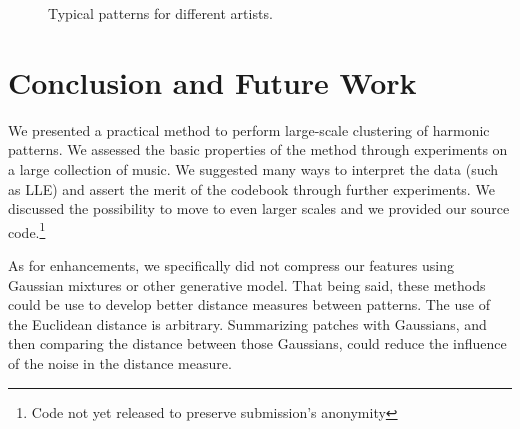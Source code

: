 \documentclass{article}
\begin{document}
\begin{figure}[htb]
  \centering
  \hspace{5mm}                
  \vspace{2mm}
  \caption{\small{Typical patterns for different artists.}}
  \label{fig:typicalpat}
\end{figure}



\section{Conclusion and Future Work}
We presented a practical method to perform large-scale clustering of
harmonic patterns. We assessed the basic properties of the method through
experiments on a large collection of music. We suggested many ways
to interpret the data (such as LLE) and assert the merit of the codebook
through further experiments.
We discussed the possibility to move to even larger scales
and we provided our source code.\footnote{Code not yet released to preserve
submission's anonymity}

As for enhancements, we specifically did not compress our features using
Gaussian mixtures or other generative model. That being said, these methods
could be use to develop better distance measures between patterns.
The use of the Euclidean distance is arbitrary. Summarizing patches
with Gaussians, and then comparing the distance between those Gaussians,
could reduce the influence of the noise in the distance measure.
\end{document}
